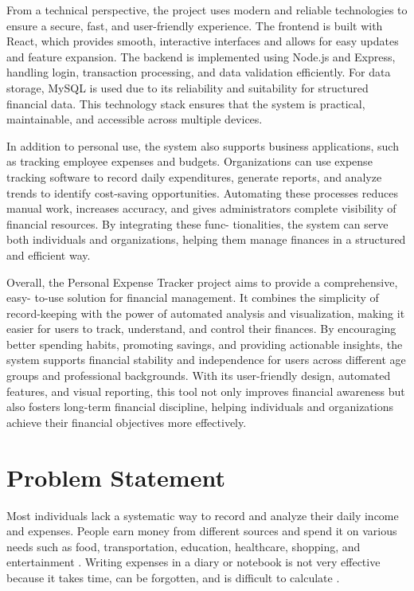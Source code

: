 \documentclass[12pt]{report} %
\begin{document}
\newpage

From a technical perspective, the project uses modern and reliable technologies to ensure
a secure, fast, and user-friendly experience. The frontend is built with React, which provides
smooth, interactive interfaces and allows for easy updates and feature expansion. The
backend is implemented using Node.js and Express, handling login, transaction processing,
and data validation efficiently. For data storage, MySQL is used due to its reliability and
suitability for structured financial data. This technology stack ensures that the system is
practical, maintainable, and accessible across multiple devices.

In addition to personal use, the system also supports business applications, such as
tracking employee expenses and budgets. Organizations can use expense tracking software
to record daily expenditures, generate reports, and analyze trends to identify cost-saving
opportunities. Automating these processes reduces manual work, increases accuracy, and
gives administrators complete visibility of financial resources. By integrating these func-
tionalities, the system can serve both individuals and organizations, helping them manage
finances in a structured and efficient way.

Overall, the Personal Expense Tracker project aims to provide a comprehensive, easy-
to-use solution for financial management. It combines the simplicity of record-keeping
with the power of automated analysis and visualization, making it easier for users to
track, understand, and control their finances. By encouraging better spending habits,
promoting savings, and providing actionable insights, the system supports financial stability
and independence for users across different age groups and professional backgrounds. With
its user-friendly design, automated features, and visual reporting, this tool not only improves
financial awareness but also fosters long-term financial discipline, helping individuals and
organizations achieve their financial objectives more effectively.

\newpage
\chapter{Problem Statement}

Most individuals lack a systematic way to record and analyze their daily income and expenses.
People earn money from different sources and spend it on various needs such as food,
transportation, education, healthcare, shopping, and entertainment \cite{singh2021spending}.
Writing expenses in a diary or notebook is not very effective because it takes time, can be
forgotten, and is difficult to calculate \cite{manchanda2017expense}.
\end{document}
